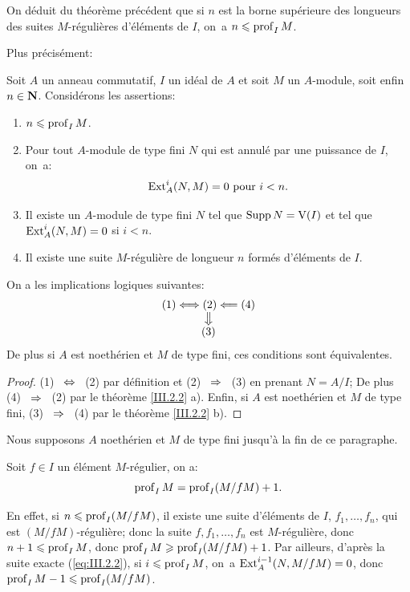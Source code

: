 On d\'eduit du th\'eor\`eme pr\'ec\'edent que si $n$ est la borne sup\'erieure des longueurs des suites $M$-r\'eguli\`eres d'\'el\'ements de $I$, on~a $n\leqslant\operatorname{prof}_I M$.

\noindent Plus pr\'ecis\'ement:

\begin{proposition} \label{III.2.4}
Soit $A$ un anneau commutatif, $I$ un id\'eal de $A$ et soit $M$ un $A$-module, soit enfin $n\in \mathbf{N}$. Consid\'erons les assertions:
\begin{enumerate}
\item
$n\leqslant \operatorname{prof}_I M$.
\item
Pour tout $A$-module de type fini $N$ qui est annul\'e par une puissance de $I$, on~a:
\[
\operatorname{Ext}_A^i(N, M)=0 \text{ pour } i<n.
\]
\item
Il existe un $A$-module de type fini $N$ tel que $\operatorname{Supp} N = \operatorname{V}(I)$ et tel que $\operatorname{Ext}_A^i(N, M)=0$ si $i<n$.
\item
Il existe une suite $M$-r\'eguli\`ere de longueur $n$ form\'es d'\'el\'ements de $I$.
\end{enumerate}

On a les implications logiques suivantes:
\[
\begin{array}{c}\dpl \textup{(1)} \Ssi \textup{(2)} \From (4) \\
\big\Downarrow \\
\textup{(3)} \\
\end{array}
\]
De plus si $A$ est noeth\'erien et $M$ de type fini, ces conditions sont \'equivalentes.
\end{proposition}

\skpt
\begin{proof}
(1) ~$\Ssi$~ (2) par d\'efinition et (2) ~$\To$~ (3) en prenant $N=A/I$; De plus (4) ~$\To$~ (2) par le th\'eor\`eme \ref{III.2.2} a). Enfin, si $A$ est noeth\'erien et $M$ de type fini, (3) ~$\To$~ (4) par le th\'eor\`eme \ref{III.2.2} b).
\skipqed
\end{proof}

Nous supposons $A$ noeth\'erien et $M$ de type fini jusqu'\`a la fin de ce paragraphe.

\begin{corollaire} \label{III.2.5}
Soit $f\in I$ un \'el\'ement $M$-r\'egulier, on a:
\[
\operatorname{prof}_I M = \operatorname{prof}_I (M/fM) + 1.
\]
\end{corollaire}

En effet, si $n\leqslant \operatorname{prof}_I (M/fM)$, il existe une suite d'\'el\'ements de $I$, $f_1, \ldots, f_n$, qui est $(M/fM)$-r\'eguli\`ere; donc la suite $f, f_1, \ldots, f_n$ est $M$-r\'eguli\`ere, donc $n+1 \leqslant \operatorname{prof}_I M$, donc $\operatorname{prof}_I M\geqslant \operatorname{prof}_I (M/fM) + 1$. Par ailleurs, d'apr\`es la suite exacte (\ref{eq:III.2.2}), si $i \leqslant \operatorname{prof}_I M$, on~a $\operatorname{Ext}_A^{i-1} (N, M/fM)=0$, donc $\operatorname{prof}_I M - 1 \leqslant \operatorname{prof}_I (M/fM)$.

